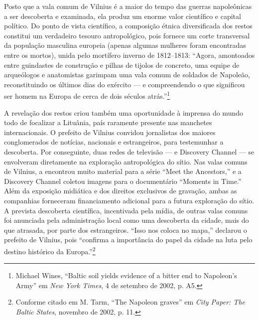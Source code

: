 Posto que a vala comum de Vilnius é a maior do tempo das guerras
napoleônicas a ser descoberta e examinada, ela produz um enorme valor
científico e capital político. Do ponto de vista científico, a
composição étnica diversificada dos restos constitui um verdadeiro
tesouro antropológico, pois fornece um corte transversal da população
masculina europeia (apenas algumas mulheres foram encontradas entre os
mortos), unida pelo mortífero inverno de 1812--1813: ``Agora, amontoados
entre guindastes de construção e pilhas de tijolos de concreto, uma
equipe de arqueólogos e anatomistas garimpam uma vala comum de soldados
de Napoleão, reconstituindo os últimos dias do exército --- e
compreendendo o que significou ser homem na Europa de cerca de dois
séculos atrás.''\footnote{Michael Wines, ``Baltic soil yields evidence of a bitter end to Napoleon's Army'' em \textit{New York Times}, 4 de setembro de 2002, p. A5.}

A revelação dos restos criou também uma oportunidade à imprensa do mundo
todo de focalizar a Lituânia, país raramente presente nas manchetes
internacionais. O prefeito de Vilnius convidou jornalistas dos maiores
conglomerados de notícias, nacionais e estrangeiros, para testemunhar a
descoberta. Por conseguinte, duas redes de televisão ---  e Discovery
Channel --- se envolveram diretamente na exploração antropológica do
sítio. Nas valas comuns de Vilnius, a  encontrou muito material para
a série ``Meet the Ancestors,'' e a Discovery Channel coletou imagens
para o documentário ``Moments in Time.'' Além da exposição midiática e
dos direitos exclusivos de gravação, ambas as companhias forneceram
financiamento adicional para a futura exploração do sítio. A prevista
descoberta científica, incentivada pela mídia, de outras valas comuns
foi anunciada pela administração local como uma descoberta da cidade,
mais do que atrasada, por parte dos estrangeiros. ``Isso nos coloca no
mapa,'' declarou o prefeito de Vilnius, pois ``confirma a importância do
papel da cidade na luta pelo destino histórico da Europa.''\footnote{Conforme citado em M. Tarm, ``The Napoleon graves'' em \textit{City Paper: The Baltic States}, novembro de 2002, p. 11.}

